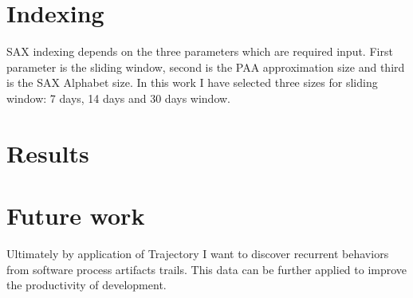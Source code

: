 \documentclass[a4paper,10pt]{article}
\numberwithin{equation}{subsection}
\begin{document}
\section{Indexing}
SAX indexing depends on the three parameters which are required input. First parameter is
the sliding window, second is the PAA approximation size and third is the SAX Alphabet size.
In this work I have selected three sizes for sliding window: 7 days, 14 days and 30 days window.

\section{Results}


\section{Future work}
Ultimately by application of Trajectory I want to discover recurrent behaviors from
software process artifacts trails. This data can be further applied to improve the
productivity of development.


\clearpage


\clearpage




\end{document}
